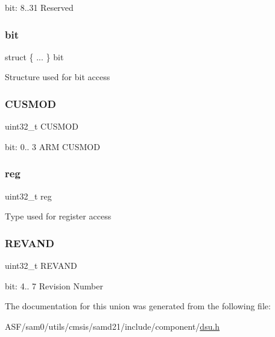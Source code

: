 bit\+: 8..31 Reserved \mbox{\label{union_d_s_u___p_i_d3___type_a2b19a0fa7a3835eb615494c4b2b0255d}} 
\subsubsection{\texorpdfstring{bit}{bit}}
{\footnotesize\ttfamily struct \{ ... \}   bit}

Structure used for bit access \mbox{\label{union_d_s_u___p_i_d3___type_abce93aebb35f28215ed71f8d5015e9e6}} 
\subsubsection{\texorpdfstring{CUSMOD}{CUSMOD}}
{\footnotesize\ttfamily uint32\+\_\+t C\+U\+S\+M\+OD}

bit\+: 0.. 3 A\+RM C\+U\+S\+M\+OD \mbox{\label{union_d_s_u___p_i_d3___type_a6b91636401516a477989a336376d7b40}} 
\subsubsection{\texorpdfstring{reg}{reg}}
{\footnotesize\ttfamily uint32\+\_\+t reg}

Type used for register access \mbox{\label{union_d_s_u___p_i_d3___type_ae57a0251504759538f043ef033cfc143}} 
\subsubsection{\texorpdfstring{REVAND}{REVAND}}
{\footnotesize\ttfamily uint32\+\_\+t R\+E\+V\+A\+ND}

bit\+: 4.. 7 Revision Number 

The documentation for this union was generated from the following file\+:\begin{DoxyCompactItemize}
\item 
A\+S\+F/sam0/utils/cmsis/samd21/include/component/\mbox{\hyperlink{component_2dsu_8h}{dsu.\+h}}\end{DoxyCompactItemize}
